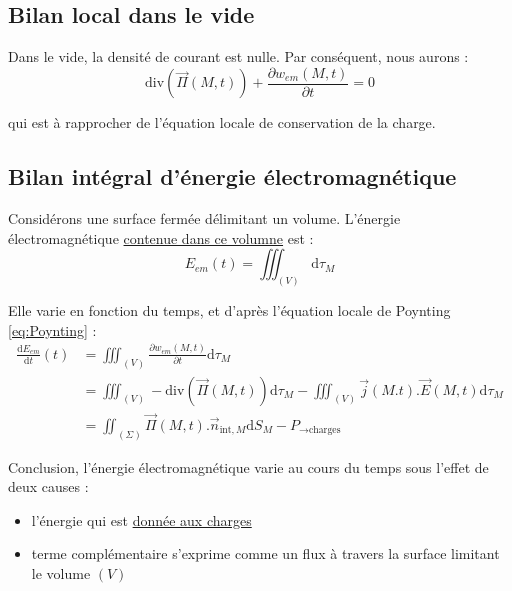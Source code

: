 \subsection{Bilan local dans le vide} %
\label{sub:Bilan local dans le vide}

Dans le vide, la densité de courant est nulle. Par conséquent, nous aurons : 
\begin{equation}
  \mathrm{div}(\overrightarrow{\Pi}(M,t)) + \frac{\partial w _{em}(M,t)}{\partial t}  = 0
\end{equation}

qui est à rapprocher de l'équation locale de conservation de la charge. 




\subsection{Bilan intégral d'énergie électromagnétique} %
\label{sub:Bilan intégral d'énergie électromagnétique}

Considérons une surface fermée délimitant un volume. L'énergie électromagnétique \underline{contenue dans ce volumne} est :
\begin{equation}
  E _{em}(t) = \iiint_{(V)} \mathrm{d} \tau_M
\end{equation}

Elle varie en fonction du temps, et d'après l'équation locale de Poynting \ref{eq:Poynting} : 
\begin{align}
  \frac{\mathrm{d}E _{em}}{\mathrm{d}t} (t) &= \iiint _{(V)} \frac{\partial w _{em}(M,t)}{\partial t} \mathrm{d} \tau_M \\ 
                                            &= \iiint _{(V)} - \mathrm{div} (\overrightarrow{\Pi}(M,t)) \mathrm{d} \tau_M - \iiint _{(V)} \overrightarrow{j}(M.t) . \overrightarrow{E}(M,t) \mathrm{d} \tau_M \\
                                            &= \iint _{(\Sigma)} \overrightarrow{\Pi}(M,t) . \overrightarrow{n} _{\text{int},M} \mathrm{d}S_M - P _{ \to \text{charges}}
\end{align}

Conclusion, l'énergie électromagnétique varie au cours du temps sous l'effet de deux causes : 
\begin{itemize}

    \item l'énergie qui est \underline{donnée aux charges}
    \item terme complémentaire s'exprime comme un flux à travers la surface limitant le volume $(V)$

\end{itemize}


